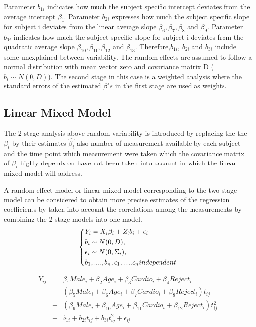 \documentclass[11pt]{article}
\begin{document}
\noindent Parameter $b_{1i}$ indicates how much the subject specific intercept deviates from the average intercept $\beta_{1}$. Parameter $b_{2i}$ expresses how much the subject specific slope for subject i deviates from the linear average slope  $\beta_{6},\beta_{7},\beta_{8}$ and $\beta_{9}$. Parameter $b_{3i}$ indicates how much the subject specific slope for subject i deviates from the quadratic average slope  $\beta_{10},\beta_{11},\beta_{12}$ and $\beta_{13}$. Therefore,$b_{1i}$, $b_{2i}$ and $b_{3i}$ include some unexplained between variability. The random effects are assumed to follow a normal distribution with mean vector zero and covariance matrix D ($b_{i} \sim N(0,D)$). The second stage in this case is a weighted analysis where the standard errors of the estimated $\beta 's$ in the first stage are used as weights.

\subsection{Linear Mixed Model}
The 2 stage analysis above random variability is introduced by replacing the the $\beta_{i}$ by their estimates $\hat{\beta_{i}}$ also number of measurement available by each subject and the time point which measurement were taken which the covariance matrix of $\beta_{i}$ highly depends on have not been taken into account in which the linear mixed model will address\cite{bib8}.

A random-effect model or linear mixed model corresponding to the two-stage model can be considered to obtain more precise estimates of the regression coefficients by taken into account the correlations among the measurements by combining the 2 stage models into one model\cite{bib8}.
\[ \begin{dcases*} Y_{i} = X_{i}\beta_{i} + Z_{i}b_{i} +\epsilon_{i} \\ 
b_{i} \sim N(0,D),\\
\epsilon_{i} \sim N(0,\Sigma_{i}),\\
b_{1},....,b_{n},\epsilon_{1},.....\epsilon_{n} independent\\
\end{dcases*}  \]


\begin{eqnarray}\label{model5}
\nonumber Y_{ij} &=& \beta_{1}Male_{i} + \beta_{2}Age_{i} + \beta_{3}Cardio_{i} + \beta_{4}Reject_{i}\\
\nonumber &+& (\beta_{5}Male_{i} + \beta_{6}Age_{i} + \nonumber \beta_{7}Cardio_{i} + \beta_{8}Reject_{i})t_{ij}\\
\nonumber &+& (\beta_{9}Male_{i} + \beta_{10}Age_{i} + \beta_{11}Cardio_{i} + \beta_{12}Reject_{i})t^{2}_{ij}\\
 &+& b_{1i} + b_{2i}t_{ij} + b_{3i}t_{ij}^2
+ \epsilon_{ij}
\end{eqnarray}
\end{document}
